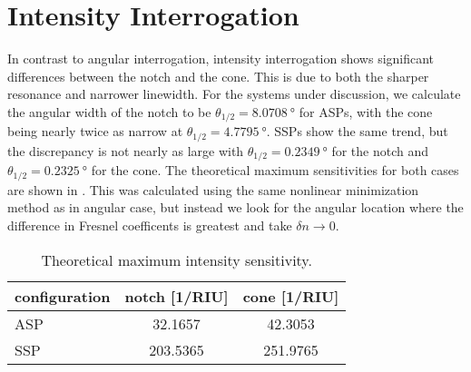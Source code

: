 \section{Intensity Interrogation}
In contrast to angular interrogation, intensity interrogation shows
significant differences between the notch and the cone.  This is due to
both the sharper resonance and narrower linewidth.  For the systems under
discussion, we calculate the angular width of the notch to be
$\theta_{1/2}=\SI{8.0708}{\degree}$ for ASPs, with the cone being nearly
twice as narrow at $\theta_{1/2}=\SI{4.7795}{\degree}$.  SSPs show the same
trend, but the discrepancy is not nearly as large with
$\theta_{1/2}=\SI{0.2349}{\degree}$ for the notch and
$\theta_{1/2}=\SI{0.2325}{\degree}$ for the cone.  The theoretical maximum
sensitivities for both cases are shown in .  This
was calculated using the same nonlinear minimization method as in angular
case, but instead we look for the angular location where the difference in Fresnel
coefficents is greatest and take $\delta n \to 0$.
\begin{table}
\centering
\begin{tabular}{lSS}
\toprule
{configuration} & {notch [1/RIU]} & {cone [1/RIU]} \\
\midrule
ASP & 32.1657 & 42.3053 \\
SSP & 203.5365 & 251.9765 \\
\bottomrule
\end{tabular}
\caption{Theoretical maximum intensity sensitivity.}
\label{tbl:intensitysens}
\end{table}


